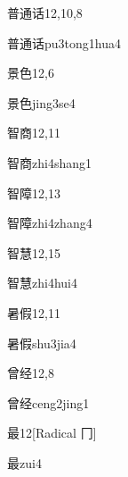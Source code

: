 \begin{entry}{普通话}{12,10,8}
  \begin{phonetics}{普通话}{pu3tong1hua4}
  \end{phonetics}
\end{entry}

\begin{entry}{景色}{12,6}
  \begin{phonetics}{景色}{jing3se4}
  \end{phonetics}
\end{entry}

\begin{entry}{智商}{12,11}
  \begin{phonetics}{智商}{zhi4shang1}
  \end{phonetics}
\end{entry}

\begin{entry}{智障}{12,13}
  \begin{phonetics}{智障}{zhi4zhang4}
  \end{phonetics}
\end{entry}

\begin{entry}{智慧}{12,15}
  \begin{phonetics}{智慧}{zhi4hui4}
  \end{phonetics}
\end{entry}

\begin{entry}{暑假}{12,11}
  \begin{phonetics}{暑假}{shu3jia4}
  \end{phonetics}
\end{entry}

\begin{entry}{曾经}{12,8}
  \begin{phonetics}{曾经}{ceng2jing1}
  \end{phonetics}
\end{entry}

\begin{entry}{最}{12}[Radical 冂]
  \begin{phonetics}{最}{zui4}
  \end{phonetics}
\end{entry}

